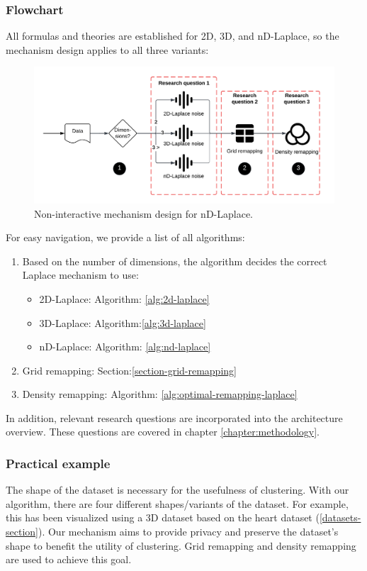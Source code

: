 \subsubsection{Flowchart}
All formulas and theories are established for 2D, 3D, and nD-Laplace, so the mechanism design applies to all three variants:
\begin{figure}[h]
  \includegraphics[width=1.1\textwidth]{TheorethicalFramework//ND-Laplace//Images/overview.png}
  \caption{Non-interactive mechanism design for nD-Laplace.}
  \label{fig:final-mechanism-design}
\end{figure}
For easy navigation, we provide a list of all algorithms:
\begin{enumerate}
  \item Based on the number of dimensions, the algorithm decides the correct Laplace mechanism to use:
        \begin{itemize}
          \item 2D-Laplace:  Algorithm: \ref{alg:2d-laplace}
          \item 3D-Laplace:  Algorithm:\ref{alg:3d-laplace}
          \item nD-Laplace: Algorithm: \ref{alg:nd-laplace}
        \end{itemize}
  \item Grid remapping: Section:\ref{section-grid-remapping}
  \item Density remapping: Algorithm: \ref{alg:optimal-remapping-laplace}
\end{enumerate}
In addition, relevant research questions are incorporated into the architecture overview.
These questions are covered in chapter \ref{chapter:methodology}.
\subsubsection{Practical example}
The shape of the dataset is necessary for the usefulness of clustering.
With our algorithm, there are four different shapes/variants of the dataset.
For example, this has been visualized using a 3D dataset based on the heart dataset (\ref{datasets-section}).
Our mechanism aims to provide privacy and preserve the dataset's shape to benefit the utility of clustering.
Grid remapping and density remapping are used to achieve this goal.

